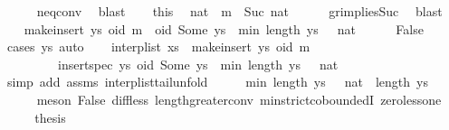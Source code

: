 \begin{isabellebody}
\ \ \ \ \isamarkupfalse%
\ neq{}{\isacharunderscore}conv\ \isamarkupfalse%
\ blast{\isacharplus}\isanewline
\ \ \isamarkupfalse%
\ this\ \isamarkupfalse%
\ nat\ \ {\isachardoublequoteopen}m\ {\isacharequal}\ Suc\ nat{\isachardoublequoteclose}\isanewline
\ \ \ \ \isamarkupfalse%
\ gr{}{\isacharunderscore}implies{\isacharunderscore}Suc\ \isamarkupfalse%
\ blast\isanewline
\ \ \isamarkupfalse%
\ {\isachardoublequoteopen}make{\isacharunderscore}insert\ ys\ oid\ m\ {\isacharequal}\ {\isacharparenleft}oid{\isacharcomma}\ Some\ {\isacharparenleft}ys\ {\isacharbang}\ min\ {\isacharparenleft}length\ ys\ {\isacharminus}\ {}{\isacharparenright}\ nat{\isacharparenright}{\isacharparenright}{\isachardoublequoteclose}\isanewline
\ \ \ \ \isamarkupfalse%
\ False\ \isamarkupfalse%
\ {\isacharparenleft}cases\ ys{\isacharcomma}\ auto{\isacharparenright}\isanewline
\ \ \isamarkupfalse%
\ {\isachardoublequoteopen}interp{\isacharunderscore}list\ {\isacharparenleft}xs\ {\isacharat}\ {\isacharbrackleft}make{\isacharunderscore}insert\ ys\ oid\ m{\isacharbrackright}{\isacharparenright}\ {\isacharequal}\isanewline
\ \ \ \ \ \ \ \ \ insert{\isacharunderscore}spec\ ys\ {\isacharparenleft}oid{\isacharcomma}\ Some\ {\isacharparenleft}ys\ {\isacharbang}\ min\ {\isacharparenleft}length\ ys\ {\isacharminus}\ {}{\isacharparenright}\ nat{\isacharparenright}{\isacharparenright}{\isachardoublequoteclose}\isanewline
\ \ \ \ \isamarkupfalse%
\ {\isacharparenleft}simp\ add{\isacharcolon}\ assms{\isacharparenleft}{}{\isacharparenright}\ interp{\isacharunderscore}list{\isacharunderscore}tail{\isacharunderscore}unfold{\isacharparenright}\isanewline
\ \ \isamarkupfalse%
\ \isamarkupfalse%
\ {\isachardoublequoteopen}min\ {\isacharparenleft}length\ ys\ {\isacharminus}\ {}{\isacharparenright}\ nat\ {\isacharless}\ length\ ys{\isachardoublequoteclose}\isanewline
\ \ \ \ \isamarkupfalse%
\ {\isacharparenleft}meson\ False\ diff{\isacharunderscore}less\ length{\isacharunderscore}greater{\isacharunderscore}{}{\isacharunderscore}conv\ min{\isachardot}strict{\isacharunderscore}coboundedI{}\ zero{\isacharunderscore}less{\isacharunderscore}one{\isacharparenright}\isanewline
\ \ \isamarkupfalse%
\ \isamarkupfalse%
\ {\isacharquery}thesis\isanewline

\end{isabellebody}
